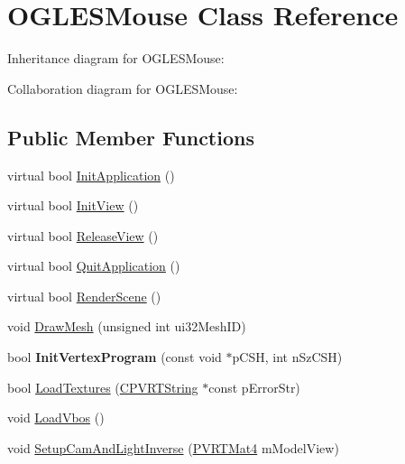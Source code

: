 \hypertarget{class_o_g_l_e_s_mouse}{\section{O\+G\+L\+E\+S\+Mouse Class Reference}
\label{class_o_g_l_e_s_mouse}
}


Inheritance diagram for O\+G\+L\+E\+S\+Mouse\+:


Collaboration diagram for O\+G\+L\+E\+S\+Mouse\+:
\subsection*{Public Member Functions}
\begin{DoxyCompactItemize}
\item 
virtual bool \hyperlink{class_o_g_l_e_s_mouse_adc04eb26c61cc539ce93fff940fccddf}{Init\+Application} ()
\item 
virtual bool \hyperlink{class_o_g_l_e_s_mouse_a7d4f2e1c7844acca97df76bcc11589b0}{Init\+View} ()
\item 
virtual bool \hyperlink{class_o_g_l_e_s_mouse_a328f7aa1e71496c7f245f1ed5f082f1f}{Release\+View} ()
\item 
virtual bool \hyperlink{class_o_g_l_e_s_mouse_acbd12070c78c1fa66f545fcb5311dbd4}{Quit\+Application} ()
\item 
virtual bool \hyperlink{class_o_g_l_e_s_mouse_a5b0de73d18f07db23e661851f150678e}{Render\+Scene} ()
\item 
void \hyperlink{class_o_g_l_e_s_mouse_ab27fb52bffafe77448f28409481039cf}{Draw\+Mesh} (unsigned int ui32\+Mesh\+I\+D)
\item 
\hypertarget{class_o_g_l_e_s_mouse_adebb104b9254ebb906642b5efdb6478c}{bool {\bfseries Init\+Vertex\+Program} (const void $\ast$p\+C\+S\+H, int n\+Sz\+C\+S\+H)}\label{class_o_g_l_e_s_mouse_adebb104b9254ebb906642b5efdb6478c}

\item 
bool \hyperlink{class_o_g_l_e_s_mouse_a165ffeaf9b0b8a82da05d1481dc13274}{Load\+Textures} (\hyperlink{class_c_p_v_r_t_string}{C\+P\+V\+R\+T\+String} $\ast$const p\+Error\+Str)
\item 
void \hyperlink{class_o_g_l_e_s_mouse_a282577c54d8f1f4b54194618a5511e1d}{Load\+Vbos} ()
\item 
void \hyperlink{class_o_g_l_e_s_mouse_aa937097d456588ffd1c94f710ce14e20}{Setup\+Cam\+And\+Light\+Inverse} (\hyperlink{struct_p_v_r_t_mat4}{P\+V\+R\+T\+Mat4} m\+Model\+View)
\end{DoxyCompactItemize}


